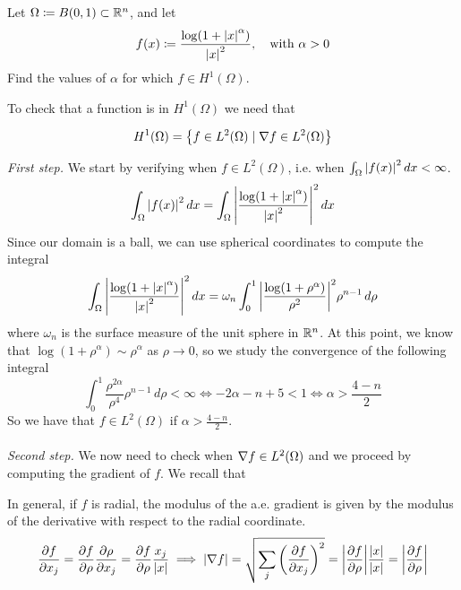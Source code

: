 \begin{exercise}
    Let \(\Omega \coloneqq B(0, 1) \subset \mathbb{R}^n\), and let 
    \[
        f(x) \coloneqq \frac{\log(1+\abs{x}^\alpha)}{\abs{x}^2}, \quad \text{with } \alpha > 0
    \]
    Find the values of \(\alpha\) for which \(f \in H^1(\Omega)\).
\end{exercise}
To check that a function is in \(H^1(\Omega)\) we need that
\begin{remark}
    \[
        H^1(\Omega) = \left\{ f \in L^2(\Omega) \mid \nabla f \in L^2(\Omega) \right\}
    \]  
\end{remark}
\textit{First step.} We start by verifying when \(f \in L^2(\Omega)\), i.e. when \(\int_\Omega \abs{f(x)}^2 \, dx < \infty\).
\[
    \begin{split}
        \int_\Omega \abs{f(x)}^2 \, dx = \int_\Omega \abs{\frac{\log(1+\abs{x}^\alpha)}{\abs{x}^2}}^2 \, dx
    \end{split}
\]
Since our domain is a ball, we can use spherical coordinates to compute the integral
\begin{align*}
\int_\Omega \abs{\frac{\log(1+\abs{x}^\alpha)}{\abs{x}^2}}^2 \, dx = \omega_n \int_0^1 \abs{\frac{\log(1+\rho^\alpha)}{\rho^2}}^2  \rho^{n-1} \, d\rho
\end{align*}
where \(\omega_n\) is the surface measure of the unit sphere in \(\mathbb{R}^n\).
At this point, we know that $\log(1+\rho^\alpha) \sim \rho^\alpha$ as $\rho \to 0$, so we study the convergence of the following integral
\begin{equation*}
\int_0^1 \frac{\rho^{2\alpha}}{\rho^4} \rho^{n-1} \, d\rho < \infty \iff - 2 \alpha - n + 5 < 1 \iff \alpha > \frac{4-n}{2}
\end{equation*}
So we have that \(f \in L^2(\Omega)\) if \(\alpha > \frac{4-n}{2}\).\\
\vspace{0.1cm}\\
\textit{Second step.} We now need to check when \(\nabla f \in L^2(\Omega)\) and we proceed by computing the gradient of \(f\).
We recall that 
\begin{remark}
In general, if \(f\) is radial, the modulus of the a.e. gradient is given by the modulus of the derivative with respect to the radial coordinate.
\begin{equation*}
\frac{\partial f}{\partial x_j} = \frac{\partial f}{\partial \rho} \frac{\partial \rho}{\partial x_j} = \frac{\partial f}{\partial \rho} \frac{x_j}{\abs{x}}
\implies \abs{\nabla f} = \sqrt{\sum_j \left(\frac{\partial f}{\partial x_j}\right)^2} = \abs{\frac{\partial f}{\partial \rho}} \frac{\abs{x}}{\abs{x}} = \abs{\frac{\partial f}{\partial \rho}}
\end{equation*}
\end{remark}
